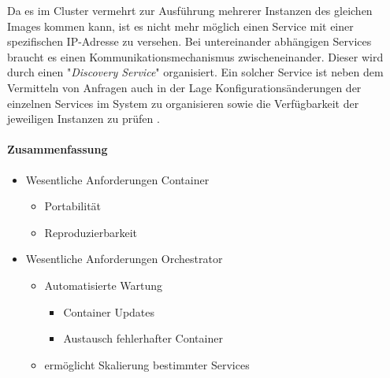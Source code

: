Da es im Cluster vermehrt zur Ausführung mehrerer Instanzen des gleichen Images kommen kann, ist es nicht mehr möglich einen Service mit einer spezifischen IP-Adresse zu versehen. Bei untereinander abhängigen Services braucht es einen Kommunikationsmechanismus zwischeneinander. Dieser wird durch einen "\emph{Discovery Service}" organisiert. Ein solcher Service ist neben dem Vermitteln von Anfragen auch in der Lage Konfigurationsänderungen der einzelnen Services im System zu organisieren sowie die Verfügbarkeit der jeweiligen Instanzen zu prüfen \cite[Seite~45 ff.]{soffelsaswarm}.

\paragraph{Zusammenfassung \checkmark}
\begin{itemize}
  \item Wesentliche Anforderungen Container
  \begin{itemize}
    \item Portabilität
    \item Reproduzierbarkeit
  \end{itemize}
  \item Wesentliche Anforderungen Orchestrator
  \begin{itemize}
    \item Automatisierte Wartung 
    \begin{itemize}
      \item Container Updates
      \item Austausch fehlerhafter Container
    \end{itemize}
    \item ermöglicht Skalierung bestimmter Services
  \end{itemize}
\end{itemize}


